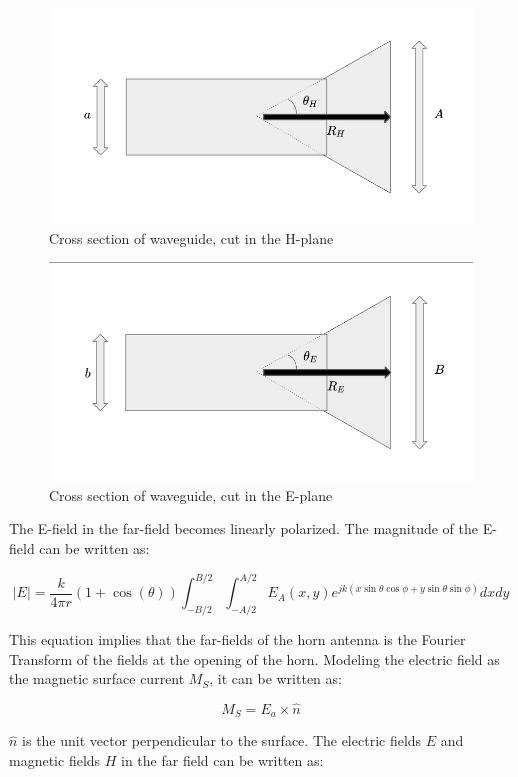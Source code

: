 \documentclass[a4paper,12pt]{report}
\begin{document}
\begin{figure}
  \begin{center}
    \includegraphics[clip, keepaspectratio, width=0.5\linewidth]{img/horn_antenna_h_plane_cross_section.png}
    \caption{Cross section of waveguide, cut in the H-plane}
    \label{fig:horn_antenna_h_plane_cross_section}
  \end{center}
\end{figure}

\begin{figure}
  \begin{center}
    \includegraphics[clip, keepaspectratio, width=0.5\linewidth]{img/horn_antenna_e_plane_cross_section.png}
    \caption{Cross section of waveguide, cut in the E-plane}
    \label{fig:horn_antenna_e_plane_cross_section}
  \end{center}
\end{figure}

The E-field in the far-field becomes linearly polarized.
The magnitude of the E-field can be written as:

\begin{equation}
  |E| = \frac{k}{4 \pi r}(1 + \cos(\theta))\int_{-B/2}^{B/2}\int_{-A/2}^{A/2}E_A(x,y)e^{jk(x\sin\theta\cos\phi + y\sin\theta\sin\phi)}dxdy
\end{equation}

This equation implies that the far-fields of the horn antenna
is the Fourier Transform of the fields at the opening of the horn.
Modeling the electric field as the magnetic surface current $M_S$,
it can be written as:

\begin{equation}
  M_S = E_a \times \hat{n}
\end{equation}

$\hat{n}$ is the unit vector perpendicular to the surface.
The electric fields $E$ and magnetic fields $H$ in the far field can be written as:
\end{document}
